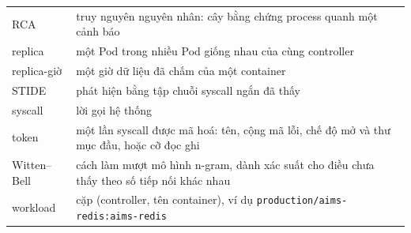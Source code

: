 \begin{longtable}[]{@{}>{\raggedright\arraybackslash}p{}>{\raggedright\arraybackslash}p{}@{}}
RCA & truy nguyên nguyên nhân: cây bằng chứng process quanh một cảnh báo \\
replica & một Pod trong nhiều Pod giống nhau của cùng controller \\
replica-giờ & một giờ dữ liệu đã chấm của một container \\
STIDE & phát hiện bằng tập chuỗi syscall ngắn đã thấy \citep{forrest1996} \\
syscall & lời gọi hệ thống \\
token & một lần syscall được mã hoá: tên, cộng mã lỗi, chế độ mở và thư mục đầu, hoặc cỡ đọc ghi \\
Witten--Bell & cách làm mượt mô hình n-gram, dành xác suất cho điều chưa thấy theo số tiếp nối khác nhau \citep{witten1991} \\
workload & cặp (controller, tên container), ví dụ \texttt{production/\allowbreak{}aims-\allowbreak{}redis:aims-\allowbreak{}redis} \\
\end{longtable}
